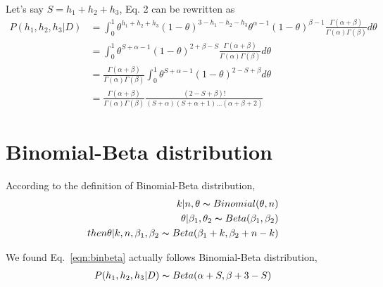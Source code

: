 \documentclass{article}
\begin{document}
Let's say $S=h_1+h_2+h_3$, Eq. 2 can be rewritten as
\begin{equation}
\begin{split}
P(h_1,h_2,h_3|D)&=\int_{0}^1 \theta^{h_1+h_2+h_3}(1-\theta)^{3-h_1-h_2-h_3}\theta^{\alpha-1}(1-\theta)^{\beta-1}\frac{\Gamma(\alpha+\beta)}{\Gamma(\alpha)\Gamma(\beta)}d\theta\\
&=\int_0^1\theta^{S+\alpha-1}(1-\theta)^{2+\beta-S}\frac{\Gamma(\alpha+\beta)}{\Gamma(\alpha)\Gamma(\beta)}d\theta\\
&=\frac{\Gamma(\alpha+\beta)}{\Gamma(\alpha)\Gamma(\beta)}\int_0^1\theta^{S+\alpha-1}(1-\theta)^{2-S+\beta}d\theta\\
&=\frac{\Gamma(\alpha+\beta)}{\Gamma(\alpha)\Gamma(\beta)}\frac{(2-S+\beta)!}{(S+\alpha)(S+\alpha+1)...(\alpha+\beta+2)}
\end{split}
\end{equation}\label{eqn:binbeta}
\section{Binomial-Beta distribution}
According to the definition of Binomial-Beta distribution,
\begin{equation}
\begin{split}
k|n,\theta \thicksim Binomial(\theta,n)\\
\theta|\beta_1,\theta_2 \thicksim Beta(\beta_1,\beta_2)\\
then \theta|k,n,\beta_1,\beta_2 \thicksim Beta(\beta_1+k,\beta_2+n-k)
\end{split}
\end{equation}

We found Eq.~\ref{eqn:binbeta} actually follows Binomial-Beta distribution,
\begin{equation}
\begin{split}
P(h_1,h_2,h_3|D) \thicksim Beta(\alpha+S,\beta+3-S)
\end{split}
\end{equation}
\end{document}
